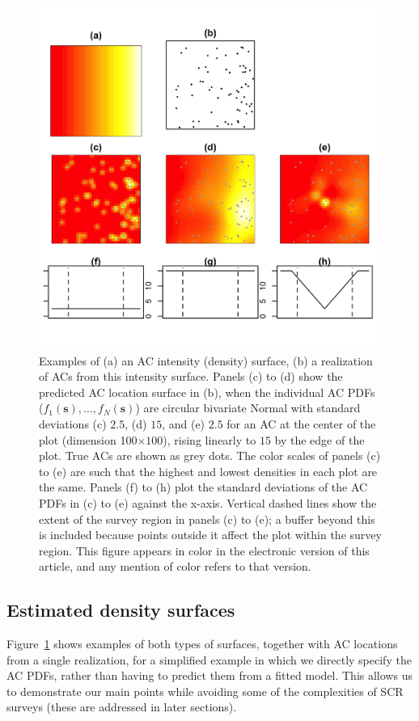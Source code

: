 \documentclass[useAMS,usenatbib,referee]{biom}
\begin{document}
\begin{figure}[htbp]
\centering
\includegraphics[width=\textwidth]{example-densities.jpg}
\caption{Examples of (a) an AC intensity (density) surface, (b) a realization of ACs from this intensity surface. Panels (c) to (d) show the predicted AC location surface in (b), when the individual AC PDFs ($f_1(\bm{s}),\ldots,f_N(\bm{s})$) are circular bivariate Normal with standard deviations (c) $2.5$, (d) $15$, and (e) $2.5$ for an AC at the center of the plot (dimension 100$\times100$), rising linearly to $15$ by the edge of the plot. True ACs are shown as grey dots. The color scales of panels (c) to (e) are such that the highest and lowest densities in each plot are the same. Panels (f) to (h) plot the standard deviations of the AC PDFs in (c) to (e) against the x-axis. Vertical dashed lines show the extent of the survey region in panels (c) to (e); a buffer beyond this is included because points outside it affect the plot within the survey region. This figure appears in color in the electronic version of this article, and any mention of color refers to that version.}
\label{fig:densities}
\end{figure}

\subsection{Estimated density surfaces}
Figure~\ref{fig:densities} shows examples of both types of surfaces, together with AC locations from a single realization, for a simplified example in which we directly specify the AC PDFs, rather than having to predict them from a fitted model. This allows us to demonstrate our main points while avoiding some of the complexities of SCR surveys (these are addressed in later sections). 
\end{document}
